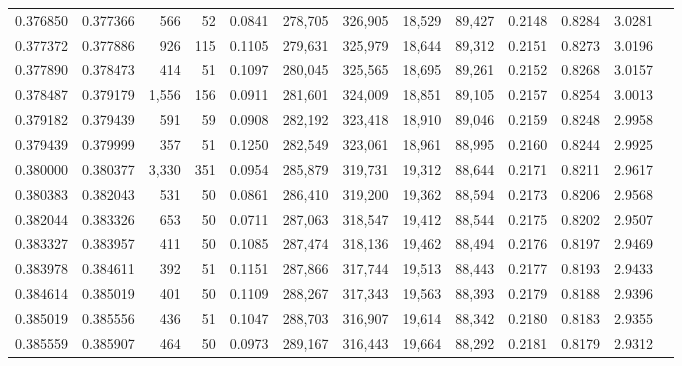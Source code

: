 \begin{tabular}{rrrrrrrrrrrrr}
0.376850 & 0.377366 &   566 &  52 &                                     0.0841 & 278,705 & 326,905 &  18,529 &  89,427 & 0.2148 & 0.8284 & 3.0281 \\
0.377372 & 0.377886 &   926 & 115 &                                     0.1105 & 279,631 & 325,979 &  18,644 &  89,312 & 0.2151 & 0.8273 & 3.0196 \\
0.377890 & 0.378473 &   414 &  51 &                                     0.1097 & 280,045 & 325,565 &  18,695 &  89,261 & 0.2152 & 0.8268 & 3.0157 \\
0.378487 & 0.379179 & 1,556 & 156 &                                     0.0911 & 281,601 & 324,009 &  18,851 &  89,105 & 0.2157 & 0.8254 & 3.0013 \\
0.379182 & 0.379439 &   591 &  59 &                                     0.0908 & 282,192 & 323,418 &  18,910 &  89,046 & 0.2159 & 0.8248 & 2.9958 \\
0.379439 & 0.379999 &   357 &  51 &                                     0.1250 & 282,549 & 323,061 &  18,961 &  88,995 & 0.2160 & 0.8244 & 2.9925 \\
0.380000 & 0.380377 & 3,330 & 351 &                                     0.0954 & 285,879 & 319,731 &  19,312 &  88,644 & 0.2171 & 0.8211 & 2.9617 \\
0.380383 & 0.382043 &   531 &  50 &                                     0.0861 & 286,410 & 319,200 &  19,362 &  88,594 & 0.2173 & 0.8206 & 2.9568 \\
0.382044 & 0.383326 &   653 &  50 &                                     0.0711 & 287,063 & 318,547 &  19,412 &  88,544 & 0.2175 & 0.8202 & 2.9507 \\
0.383327 & 0.383957 &   411 &  50 &                                     0.1085 & 287,474 & 318,136 &  19,462 &  88,494 & 0.2176 & 0.8197 & 2.9469 \\
0.383978 & 0.384611 &   392 &  51 &                                     0.1151 & 287,866 & 317,744 &  19,513 &  88,443 & 0.2177 & 0.8193 & 2.9433 \\
0.384614 & 0.385019 &   401 &  50 &                                     0.1109 & 288,267 & 317,343 &  19,563 &  88,393 & 0.2179 & 0.8188 & 2.9396 \\
0.385019 & 0.385556 &   436 &  51 &                                     0.1047 & 288,703 & 316,907 &  19,614 &  88,342 & 0.2180 & 0.8183 & 2.9355 \\
0.385559 & 0.385907 &   464 &  50 &                                     0.0973 & 289,167 & 316,443 &  19,664 &  88,292 & 0.2181 & 0.8179 & 2.9312 \\

\end{tabular}

